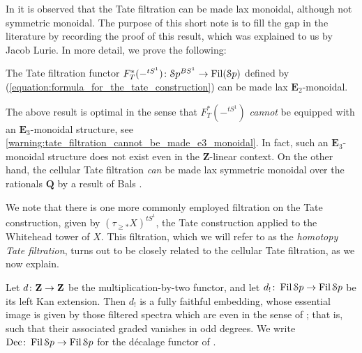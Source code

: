 \documentclass[oneside,a4paper]{amsart}
\begin{document}
In \cite[{6.1.8}]{bhatt-lurie:apc} it is observed that the Tate filtration can be made lax monoidal, although not symmetric monoidal. The purpose of this short note is to fill the gap in the literature by recording the proof of this result, which was explained to us by Jacob Lurie. In more detail, we prove the following: 

\begin{theorem}
\label{theorem:introduction_bt_tate_filtration_is_lax_e2_monoidal}
The Tate filtration functor $F_{T}^{\ast}({-}^{tS^{1}}) \colon \EuScript{S}p^{BS^{1}} \rightarrow \operatorname{Fil}(\EuScript{S}p)$ defined by (\ref{equation:formula_for_the_tate_construction}) can be made lax $\mathbf{E}_{2}$-monoidal. 
\end{theorem}

The above result is optimal in the sense that $F_{T}^{\ast}({-}^{tS^{1}})$ \emph{cannot} be equipped with an $\mathbf{E}_{3}$-monoidal structure, see  \cref{warning:tate_filtration_cannot_be_made_e3_monoidal}. In fact, such an $\mathbf{E}_{3}$-monoidal structure does not exist even in the $\mathbf{Z}$-linear context. On the other hand, the cellular Tate filtration \emph{can} be made lax symmetric monoidal over the rationals $\mathbf{Q}$ by a result of Bals \cite[{Lemma B.10}]{BalsPeriodicCyclicHomology}. 

We note that there is one more commonly employed filtration on the Tate construction, given by $(\tau_{\geq \ast} X)^{tS^{1}}$, the Tate construction applied to the Whitehead tower of $X$. This filtration, which we will refer to as the \emph{homotopy Tate filtration}, turns out to be closely related to the cellular Tate filtration, as we now explain. 

Let $d \colon \mathbf{Z} \rightarrow \mathbf{Z}$ be the multiplication-by-two functor, and let $d_{!} \colon \operatorname{Fil} \EuScript{S}p \rightarrow \operatorname{Fil} \EuScript{S}p$ be its left Kan extension. Then $d_{!}$ is a fully faithful embedding, whose essential image is given by those filtered spectra which are even in the sense of \cite[{\S 5.3.1}]{van2025introduction}; that is, such that their associated graded vanishes in odd degrees. We write $\mathrm{Dec} \colon \operatorname{Fil}\EuScript{S}p \rightarrow \operatorname{Fil}\EuScript{S}p$ for the d\'{e}calage functor of \cite{antieau:decalage}.
\end{document}
